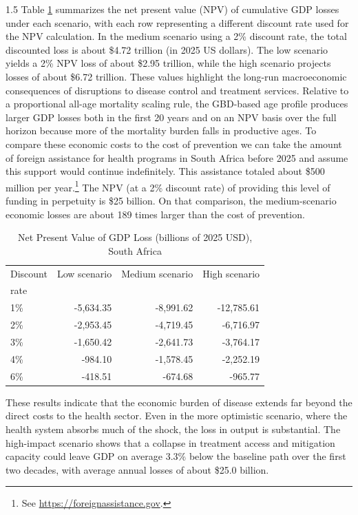 \documentclass[letterpaper,12pt]{article}
\theoremstyle{definition}
\begin{document}
\begin{spacing}{1.5}
Table \ref{tab:NPVLosses} summarizes the net present value (NPV) of cumulative GDP losses under each scenario, with each row representing a different discount rate used for the NPV calculation. In the medium scenario using a 2\% discount rate, the total discounted loss is about \$4.72 trillion (in 2025 US dollars). The low scenario yields a 2\% NPV loss of about \$2.95 trillion, while the high scenario projects losses of about \$6.72 trillion. These values highlight the long-run macroeconomic consequences of disruptions to disease control and treatment services. Relative to a proportional all-age mortality scaling rule, the GBD-based age profile produces larger GDP losses both in the first 20 years and on an NPV basis over the full horizon because more of the mortality burden falls in productive ages. To compare these economic costs to the cost of prevention we can take the amount of foreign assistance for health programs in South Africa before 2025 and assume this support would continue indefinitely. This assistance totaled about \$500 million per year.\footnote{See \href{https://foreignassistance.gov}{https://foreignassistance.gov}.} The NPV (at a 2\% discount rate) of providing this level of funding in perpetuity is \$25 billion. On that comparison, the medium-scenario economic losses are about 189 times larger than the cost of prevention.

\begin{table}[H] \centering \captionsetup{width=6.0in}
  \caption{\label{tab:NPVLosses}Net Present Value of GDP Loss (billions of 2025 USD), South Africa}
  \begin{tabular}{lrrr}
    \hline\hline
    Discount & Low scenario & Medium scenario & High scenario \\[-1.5mm]
    rate & \citet{Brink2025} & \citet{Gandhi2025} & \citet{KS2025} \\
    \hline\hline
    1\% & -5,634.35 & -8,991.62 & -12,785.61 \\
    2\% & -2,953.45 & -4,719.45 & -6,716.97 \\
    3\% & -1,650.42 & -2,641.73 & -3,764.17 \\
    4\% & -984.10 & -1,578.45 & -2,252.19 \\
    6\% & -418.51 & -674.68 & -965.77 \\
    \hline\hline
  \end{tabular}
\end{table}

These results indicate that the economic burden of disease extends far beyond the direct costs to the health sector. Even in the more optimistic scenario, where the health system absorbs much of the shock, the loss in output is substantial. The high-impact scenario shows that a collapse in treatment access and mitigation capacity could leave GDP on average 3.3\% below the baseline path over the first two decades, with average annual losses of about \$25.0 billion.


\end{spacing}
\end{document}
